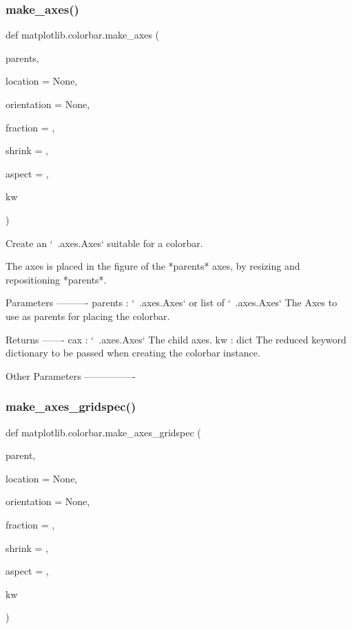 \subsubsection{\texorpdfstring{make\+\_\+axes()}{make\_axes()}}
{\footnotesize\ttfamily def matplotlib.\+colorbar.\+make\+\_\+axes (\begin{DoxyParamCaption}\item[{}]{parents,  }\item[{}]{location = {\ttfamily None},  }\item[{}]{orientation = {\ttfamily None},  }\item[{}]{fraction = {},  }\item[{}]{shrink = {},  }\item[{}]{aspect = {},  }\item[{}]{kw }\end{DoxyParamCaption})}

\begin{DoxyVerb}Create an `~.axes.Axes` suitable for a colorbar.

The axes is placed in the figure of the *parents* axes, by resizing and
repositioning *parents*.

Parameters
----------
parents : `~.axes.Axes` or list of `~.axes.Axes`
    The Axes to use as parents for placing the colorbar.

Returns
-------
cax : `~.axes.Axes`
    The child axes.
kw : dict
    The reduced keyword dictionary to be passed when creating the colorbar
    instance.

Other Parameters
----------------
\end{DoxyVerb}
 \mbox{\label{namespacematplotlib_1_1colorbar_a1c8e23c91312e04776011a9af889799a}} 
\subsubsection{\texorpdfstring{make\+\_\+axes\+\_\+gridspec()}{make\_axes\_gridspec()}}
{\footnotesize\ttfamily def matplotlib.\+colorbar.\+make\+\_\+axes\+\_\+gridspec (\begin{DoxyParamCaption}\item[{}]{parent,  }\item[{}]{location = {\ttfamily None},  }\item[{}]{orientation = {\ttfamily None},  }\item[{}]{fraction = {},  }\item[{}]{shrink = {},  }\item[{}]{aspect = {},  }\item[{}]{kw }\end{DoxyParamCaption})}


